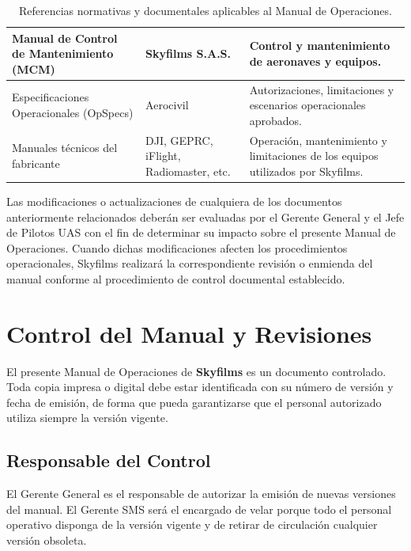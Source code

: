 \begin{table}[H]
\begin{tabularx}{\textwidth}{|p{4cm}|p{3cm}|X|}
Manual de Control de Mantenimiento (MCM) &
Skyfilms S.A.S. &
Control y mantenimiento de aeronaves y equipos. \\ \hline

Especificaciones Operacionales (OpSpecs) &
Aerocivil &
Autorizaciones, limitaciones y escenarios operacionales aprobados. \\ \hline

Manuales técnicos del fabricante &
DJI, GEPRC, iFlight, Radiomaster, etc. &
Operación, mantenimiento y limitaciones de los equipos utilizados por Skyfilms. \\ \hline

\end{tabularx}

\caption{Referencias normativas y documentales aplicables al Manual de Operaciones.}
\end{table}

Las modificaciones o actualizaciones de cualquiera de los documentos anteriormente relacionados deberán ser evaluadas por el Gerente General y el Jefe de Pilotos UAS con el fin de determinar su impacto sobre el presente Manual de Operaciones. Cuando dichas modificaciones afecten los procedimientos operacionales, Skyfilms realizará la correspondiente revisión o enmienda del manual conforme al procedimiento de control documental establecido.







\section{Control del Manual y Revisiones}

El presente Manual de Operaciones de \textbf{Skyfilms} es un documento controlado. Toda copia impresa o digital debe estar identificada con su número de versión y fecha de emisión, de forma que pueda garantizarse que el personal autorizado utiliza siempre la versión vigente.  

\subsection*{Responsable del Control}
El Gerente General es el responsable de autorizar la emisión de nuevas versiones del manual. El Gerente SMS será el encargado de velar porque todo el personal operativo disponga de la versión vigente y de retirar de circulación cualquier versión obsoleta.  


